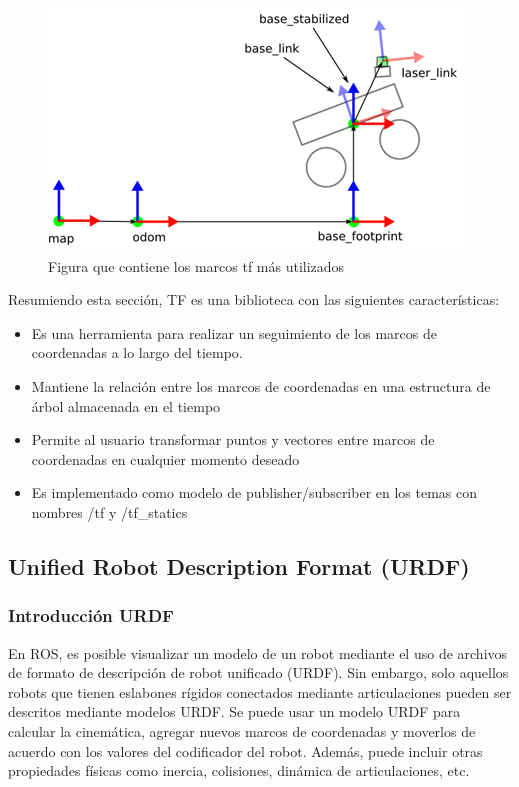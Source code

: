         
        \begin{figure}[htb]
            \centering
            \includegraphics[width=0.55\linewidth]{Main/Chapter3/Images3/3-6/nose2.png}
            \caption{Figura que contiene los marcos tf más utilizados \cite{10.5555/2904061}}
            \label{f:Cap3-6_NOSE_tf}
        \end{figure} 
        
    
        Resumiendo esta sección, TF es una biblioteca con las siguientes características:
        
        \begin{itemize}
            \item Es una herramienta para realizar un seguimiento de los marcos de coordenadas a lo largo del tiempo.
            \item Mantiene la relación entre los marcos de coordenadas en una estructura de árbol almacenada en el tiempo
            \item Permite al usuario transformar puntos y vectores entre marcos de coordenadas en cualquier momento deseado
            \item Es implementado como modelo de publisher/subscriber en los temas con nombres /tf y /tf\_statics
        \end{itemize}
        
                        \newpage

    \subsection{Unified Robot Description Format (URDF)}\label{cap2_urfdf}
    
        \subsubsection{Introducción URDF}
    
        En ROS, es posible visualizar un modelo de un robot mediante el uso de archivos de formato de descripción de robot unificado (URDF). Sin embargo, solo aquellos robots que tienen eslabones rígidos conectados mediante articulaciones pueden ser descritos mediante modelos URDF.  Se puede usar un modelo URDF para calcular la cinemática, agregar nuevos marcos de coordenadas y moverlos de acuerdo con los valores del codificador del robot. Además, puede incluir otras propiedades físicas como inercia, colisiones, dinámica de articulaciones, etc. 
        
